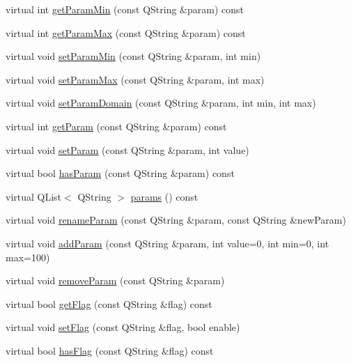 \begin{DoxyCompactItemize}
\item 
virtual int \hyperlink{class_game_object_a3a308cc3f1d11d66dd5583fb531035c3}{get\-Param\-Min} (const \-Q\-String \&param) const 
\item 
virtual int \hyperlink{class_game_object_a714857ae1ea08935b8beb76675db33e8}{get\-Param\-Max} (const \-Q\-String \&param) const 
\item 
virtual void \hyperlink{class_game_object_a369445e39ff040b9051e6e003a45fbbb}{set\-Param\-Min} (const \-Q\-String \&param, int min)
\item 
virtual void \hyperlink{class_game_object_a6c8131b466e418f796450cdbb0e81cce}{set\-Param\-Max} (const \-Q\-String \&param, int max)
\item 
virtual void \hyperlink{class_game_object_afaa71b1cb878ba95f10a13ad4e67af2b}{set\-Param\-Domain} (const \-Q\-String \&param, int min, int max)
\item 
virtual int \hyperlink{class_game_object_a4c9a0568afb851340b513207c9745734}{get\-Param} (const \-Q\-String \&param) const 
\item 
virtual void \hyperlink{class_game_object_a2cd8c2defab5b5327a65253b2a6773b9}{set\-Param} (const \-Q\-String \&param, int value)
\item 
virtual bool \hyperlink{class_game_object_ae5272e52ab14e5d87616a5dcaeb62919}{has\-Param} (const \-Q\-String \&param) const 
\item 
virtual \-Q\-List$<$ \-Q\-String $>$ \hyperlink{class_game_object_a1ef02d136f04abe43628035486dfc254}{params} () const 
\item 
virtual void \hyperlink{class_game_object_aec5d03f0a7f5d3807b10f3629c1fd146}{rename\-Param} (const \-Q\-String \&param, const \-Q\-String \&new\-Param)
\item 
virtual void \hyperlink{class_game_object_a5cbbbaebcc0204b466f79c1e6734c864}{add\-Param} (const \-Q\-String \&param, int value=0, int min=0, int max=100)
\item 
virtual void \hyperlink{class_game_object_a2f406df8dd674455ccc9505dc1746f61}{remove\-Param} (const \-Q\-String \&param)
\item 
virtual bool \hyperlink{class_game_object_ac1df89c8a28a491e1cfd102dcbd044d7}{get\-Flag} (const \-Q\-String \&flag) const 
\item 
virtual void \hyperlink{class_game_object_aeefd55b81985ac441c9778de200111d0}{set\-Flag} (const \-Q\-String \&flag, bool enable)
\item 
virtual bool \hyperlink{class_game_object_af741fb2fb5e879041c2bd95de4156eb6}{has\-Flag} (const \-Q\-String \&flag) const 

\end{DoxyCompactItemize}
